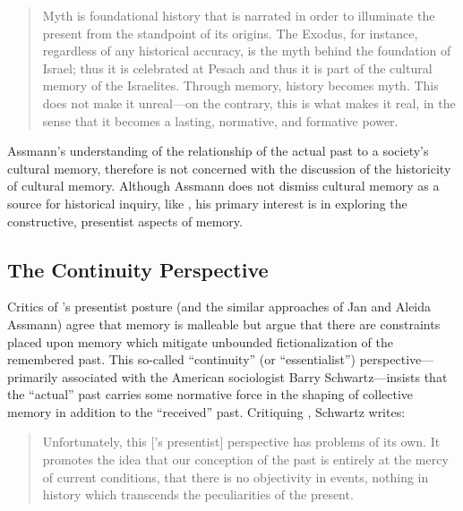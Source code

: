 \begin{quote} Myth is foundational history that is narrated in order to illuminate the present from the standpoint of its origins. The Exodus, for instance, regardless of any historical accuracy, is the myth behind the foundation of Israel; thus it is celebrated at Pesach and thus it is part of the cultural memory of the Israelites. Through memory, history becomes myth. This does not make it unreal---on the contrary, this is what makes it real, in the sense that it becomes a lasting, normative, and formative power.\autocite[38]{assmann2011} \end{quote}  

Assmann's understanding of the relationship of the actual past to a society's cultural memory, therefore is not concerned with the discussion of the historicity of cultural memory. Although Assmann does not dismiss cultural memory as a source for historical inquiry, like \halbwachs, his primary interest is in exploring the constructive, presentist aspects of memory.  

\hypertarget{the-continuity-perspective}{%
\subsection{The Continuity Perspective}\label{the-continuity-perspective}}  

Critics of \halbwachs's presentist posture (and the similar approaches of Jan and Aleida Assmann) agree that memory is malleable but argue that there are constraints placed upon memory which mitigate unbounded fictionalization of the remembered past. This so-called ``continuity'' (or ``essentialist'') perspective---primarily associated with the American sociologist Barry Schwartz---insists that the ``actual'' past carries some normative force in the shaping of collective memory in addition to the ``received'' past.\autocites[Schwartz has made numerous contributions to the field of memory studies. See esp.][]{schwartz_sf1982}{schwartz_asr1991}[and][]{schwartz2000}[Note also the SBL volume specifically interacting with his work:][]{thatcher2014} Critiquing \halbwachs, Schwartz writes:  

\begin{quote} Unfortunately, this [\halbwachs's presentist] perspective has problems of its own. It promotes the idea that our conception of the past is entirely at the mercy of current conditions, that there is no objectivity in events, nothing in history which transcends the peculiarities of the present.\autocite[376]{schwartz_sf1982} \end{quote}  

